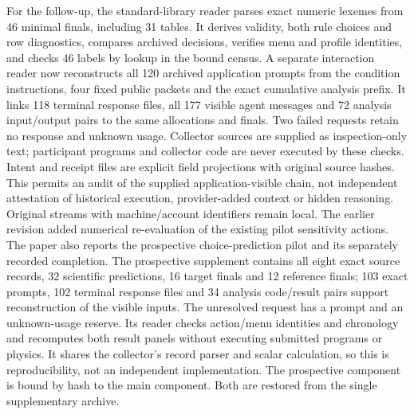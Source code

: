 For the follow-up, the standard-library reader parses exact numeric lexemes
from 46 minimal finals, including 31 tables. It derives validity, both rule
choices and row diagnostics, compares archived decisions, verifies menu and
profile identities, and checks 46 labels by lookup in the bound census.
A separate interaction reader now reconstructs all 120 archived application
prompts from the condition instructions, four fixed public packets and the
exact cumulative analysis prefix. It links 118 terminal response files,
all 177 visible agent messages and 72 analysis input/output pairs to the
same allocations and finals. Two failed requests retain no response and
unknown usage. Collector sources are supplied as inspection-only text;
participant programs and collector code are never executed by these checks.
Intent and receipt files are explicit field projections with original source
hashes. This permits an audit of the supplied application-visible chain,
not independent attestation of historical execution, provider-added context
or hidden reasoning. Original streams with machine/account identifiers remain
local. The earlier revision added numerical re-evaluation of the existing
pilot sensitivity actions. The paper also reports the
prospective choice-prediction pilot and its separately recorded completion.
The prospective supplement contains all eight exact source records, 32
scientific predictions, 16 target finals and 12 reference finals; 103 exact
prompts, 102 terminal response files and 34 analysis code/result pairs support
reconstruction of the visible inputs. The unresolved request has a prompt and
an unknown-usage reserve. Its reader checks action/menu identities and
chronology and recomputes both result panels without executing submitted
programs or physics. It shares the collector's record parser and scalar
calculation, so this is reproducibility, not an independent implementation.
The prospective component is bound by hash to the main component. Both are restored from the single supplementary archive.

